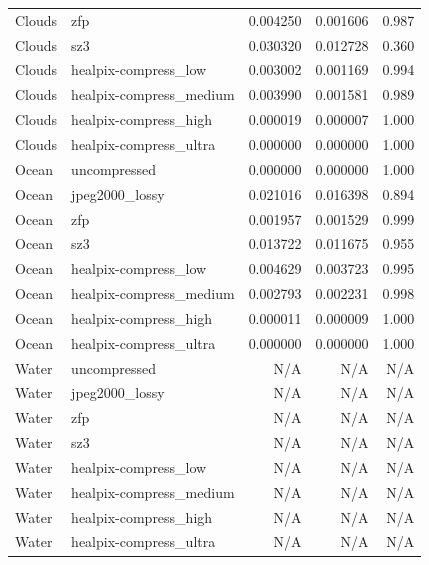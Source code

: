 \begin{table}[t]
\begin{tabular}{@{}llrrr@{}}
Clouds      & zfp                      & 0.004250 & 0.001606 & 0.987 \\
Clouds      & sz3                      & 0.030320 & 0.012728 & 0.360 \\
Clouds      & healpix-compress\_low    & 0.003002 & 0.001169 & 0.994 \\
Clouds      & healpix-compress\_medium & 0.003990 & 0.001581 & 0.989 \\
Clouds      & healpix-compress\_high   & 0.000019 & 0.000007 & 1.000 \\
Clouds      & healpix-compress\_ultra  & 0.000000 & 0.000000 & 1.000 \\
\addlinespace
Ocean       & uncompressed             & 0.000000 & 0.000000 & 1.000 \\
Ocean       & jpeg2000\_lossy          & 0.021016 & 0.016398 & 0.894 \\
Ocean       & zfp                      & 0.001957 & 0.001529 & 0.999 \\
Ocean       & sz3                      & 0.013722 & 0.011675 & 0.955 \\
Ocean       & healpix-compress\_low    & 0.004629 & 0.003723 & 0.995 \\
Ocean       & healpix-compress\_medium & 0.002793 & 0.002231 & 0.998 \\
Ocean       & healpix-compress\_high   & 0.000011 & 0.000009 & 1.000 \\
Ocean       & healpix-compress\_ultra  & 0.000000 & 0.000000 & 1.000 \\
\addlinespace
Water       & uncompressed             & N/A & N/A & N/A \\
Water       & jpeg2000\_lossy          & N/A & N/A & N/A \\
Water       & zfp                      & N/A & N/A & N/A \\
Water       & sz3                      & N/A & N/A & N/A \\
Water       & healpix-compress\_low    & N/A & N/A & N/A \\
Water       & healpix-compress\_medium & N/A & N/A & N/A \\
Water       & healpix-compress\_high   & N/A & N/A & N/A \\
Water       & healpix-compress\_ultra  & N/A & N/A & N/A \\
\bottomrule
\end{tabular}
\end{table}
